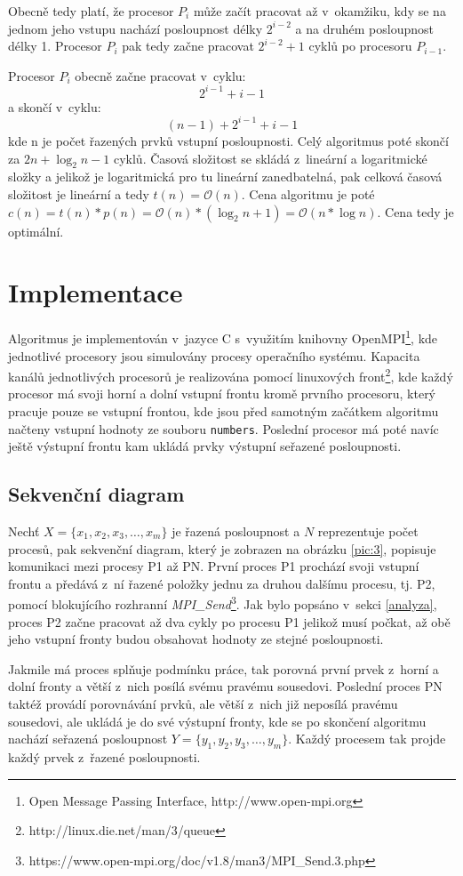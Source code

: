 \documentclass[10pt,a4paper,notitlepage]{article}
\newcommand{\bigO}{\ensuremath{\mathcal{O}}}%
\begin{document}
Obecně tedy platí, že procesor $P_{i}$ může začít pracovat až v~okamžiku, kdy se
na jednom jeho vstupu nachází posloupnost délky $2^{i-2}$ a na druhém posloupnost
délky 1. Procesor $P_{i}$ pak tedy začne pracovat $2^{i-2}+1$ cyklů po procesoru
$P_{i-1}$.

Procesor $P_{i}$ obecně začne pracovat v~cyklu: $$2^{i-1}+i-1$$ a skončí
v~cyklu:
$$(n-1)+2^{i-1}+i-1$$ kde n je počet řazených prvků vstupní posloupnosti.
Celý algoritmus poté skončí za $2n+\log_{2}n-1$ cyklů. Časová složitost se skládá
z~lineární a logaritmické složky a jelikož je logaritmická pro tu lineární
zanedbatelná, pak celková časová složitost je lineární a tedy $t(n) = \bigO(n)$.
Cena algoritmu je poté $c(n) = t(n) * p(n) = \bigO(n) * (\log_{2}n+1) =
\bigO(n*\log{n})$. Cena tedy je optimální.

\section{Implementace}
Algoritmus je implementován v~jazyce C s~využitím knihovny OpenMPI\footnote{Open
Message Passing Interface, http://www.open-mpi.org}, kde jednotlivé procesory jsou
simulovány procesy operačního systému. Kapacita kanálů jednotlivých procesorů je
realizována pomocí linuxových front\footnote{http://linux.die.net/man/3/queue},
kde každý procesor má svoji horní a dolní vstupní frontu kromě prvního
procesoru, který pracuje pouze se vstupní frontou, kde jsou před samotným
začátkem algoritmu načteny vstupní hodnoty ze souboru \texttt{numbers}.
Poslední procesor má poté navíc ještě výstupní frontu kam ukládá prvky výstupní
seřazené posloupnosti.

\subsection{Sekvenční diagram}
Nechť $X=\{x_{1}, x_{2}, x_{3}, \dots, x_{m}\}$ je řazená posloupnost a $N$
reprezentuje počet procesů, pak sekvenční diagram, který je zobrazen na obrázku \ref{pic:3}, popisuje komunikaci
mezi procesy P1 až PN. První proces P1 prochází svoji vstupní frontu a předává z~ní
řazené položky jednu za druhou dalšímu procesu, tj. P2, pomocí blokujícího
rozhranní
\textit{MPI\_Send}\footnote{https://www.open-mpi.org/doc/v1.8/man3/MPI\_Send.3.php}.
Jak bylo popsáno v~sekci \ref{analyza}, proces P2 začne pracovat až dva cykly po
procesu P1 jelikož musí počkat, až obě jeho vstupní fronty budou obsahovat hodnoty
ze stejné posloupnosti.

Jakmile má proces splňuje podmínku práce, tak porovná
první prvek z~horní a dolní fronty a větší z~nich posílá svému pravému
sousedovi. Poslední proces PN taktéž provádí porovnávání prvků, ale větší z~nich
již neposílá pravému sousedovi, ale ukládá je do své výstupní fronty, kde se po
skončení algoritmu nachází seřazená posloupnost $Y=\{y_{1}, y_{2}, y_{3}, \dots,
y_{m}\}$.  Každý procesem tak projde každý prvek z~řazené posloupnosti.  
\end{document}
